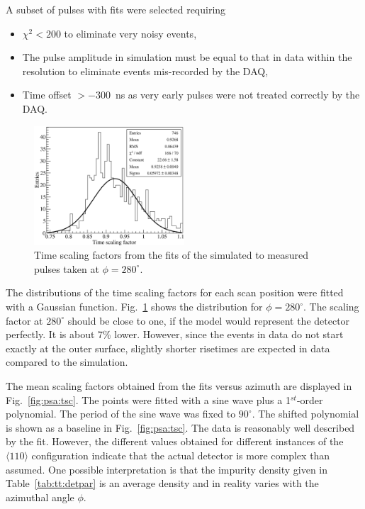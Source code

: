 A subset of pulses with fits were selected requiring
\begin{itemize}
\item $\chi^{2} < 200$ to eliminate very noisy events,
\item The pulse amplitude in simulation must be equal to that in data
within the resolution to eliminate events mis-recorded by the DAQ,
\item Time offset $> -300$~ns as very early pulses were not treated
correctly by the DAQ.
\end{itemize}

\begin{figure}[htbp]
\centering
\includegraphics[width=0.5\textwidth]{tscale280}
\caption{Time scaling factors from the fits of the simulated to
measured pulses taken at $\phi=280^{\circ}$.}
\label{fig:psa:ts280}
\end{figure}
The distributions of the time scaling factors for each scan position
were fitted with a Gaussian function. Fig.~\ref{fig:psa:ts280} shows
the distribution for $\phi = 280^{\circ}$. The scaling factor at
$280^{\circ}$ should be close to one, if the model would represent the
detector perfectly. It is about 7\% lower. However, since the events
in data do not start exactly at the outer surface, slightly shorter
risetimes are expected in data compared to the simulation.

The mean scaling factors obtained from the fits versus azimuth are
displayed in Fig.~\ref{fig:psa:tsc}. The points were fitted with a
sine wave plus a 1$^{st}$-order polynomial. The period of the sine
wave was fixed to $90^{\circ}$. The shifted polynomial is shown as a
baseline in Fig.~\ref{fig:psa:tsc}. The data is reasonably well
described by the fit. However, the different values obtained for
different instances of the $\langle 110 \rangle$ configuration
indicate that the actual detector is more complex than assumed. One
possible interpretation is that the impurity density given in
Table~\ref{tab:tt:detpar} is an average density and in reality varies
with the azimuthal angle $\phi$.

